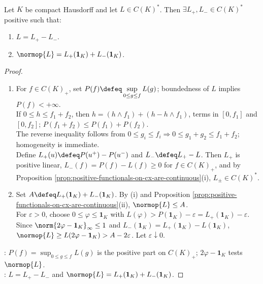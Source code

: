 \begin{proposition} \label{prop:bounded-functional-positive-decomposition-cx} \\
Let $K$ be compact Hausdorff and let $L\in C(K)^*$. Then $\exists L_+,L_-\in C(K)^*$ positive such that:
\begin{enumerate}[label=(\roman*)]
\setlength{\itemsep}{0pt}
\item $L=L_+-L_-$.
\item $\normop{L}=L_+(\mathbf{1}_K)+L_-(\mathbf{1}_K)$.
\end{enumerate}
\begin{proof}
\begin{enumerate}[label=(\roman*)]
\setlength{\itemsep}{0pt}
\item For $f\in C(K)_+$, set $P(f)\defeq\sup\limits_{0\leq g\leq f}L(g)$; boundedness of $L$ implies $P(f)<+\infty$.\\
If $0\leq h\leq f_1+f_2$, then $h=(h\wedge f_1)+(h-h\wedge f_1)$, terms in $[0,f_1]$ and $[0,f_2]$; $P(f_1+f_2)\leq P(f_1)+P(f_2)$.\\
The reverse inequality follows from $0\leq g_i\leq f_i\Rightarrow0\leq g_1+g_2\leq f_1+f_2$; homogeneity is immediate.\\
Define $L_+(u)\defeq P(u^+)-P(u^-)$ and $L_-\defeq L_+-L$. Then $L_+$ is positive linear, $L_-(f)=P(f)-L(f)\geq0$ for $f\in C(K)_+$, and by Proposition \ref{prop:positive-functionals-on-cx-are-continuous}(i), $L_\pm\in C(K)^*$.
\item Set $A\defeq L_+(\mathbf{1}_K)+L_-(\mathbf{1}_K)$. By (i) and Proposition \ref{prop:positive-functionals-on-cx-are-continuous}(ii), $\normop{L}\leq A$.\\
For $\varepsilon>0$, choose $0\leq\varphi\leq\mathbf{1}_K$ with $L(\varphi)>P(\mathbf{1}_K)-\varepsilon=L_+(\mathbf{1}_K)-\varepsilon$.\\
Since $\norm{2\varphi-\mathbf{1}_K}_\infty\leq1$ and $L_-(\mathbf{1}_K)=L_+(\mathbf{1}_K)-L(\mathbf{1}_K)$, $\normop{L}\geq L(2\varphi-\mathbf{1}_K)>A-2\varepsilon$. Let $\varepsilon\downarrow0$.
\end{enumerate}
: $P(f)=\sup_{0\leq g\leq f}L(g)$ is the positive part on $C(K)_+$; $2\varphi-\mathbf{1}_K$ tests $\normop{L}$.\\
: $L=L_+-L_-$ and $\normop{L}=L_+(\mathbf{1}_K)+L_-(\mathbf{1}_K)$.
\end{proof}
\end{proposition}

